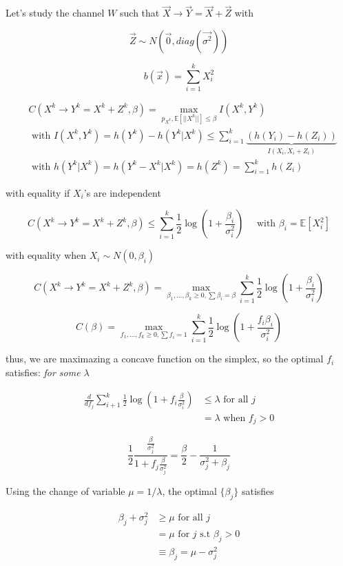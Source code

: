 \documentclass[twoside]{article}
\theoremstyle{definition} %
\newcommand{\Ex}[1]{\mathbb{E}\left[#1\right]}
\begin{document}
Let's study the channel $W$ such that $\vec{X} \to \vec Y = \vec X + \vec Z$ with

\[
  \vec{Z} \sim N(\vec{0}, diag(\vec{\sigma^2}))
\]

\[
  b(\vec{x}) = \sum_{i = 1}^k X_i^2
\]

\begin{align*}
  &C(X^k \rightarrow Y^k = X^k + Z^k, \beta) = \max_{p_{X^k}, \Ex{||X^k||} \leq \beta} I(X^k, Y^k) \\
  & \text{ with } I(X^k, Y^k) = h(Y^k) - h(Y^k | X^k) \leq \sum_{i = 1}^k \underbrace{(h(Y_i) - h(Z_i))}_{I(X_i, X_i + Z_i)} \\
  & \text{ with } h(Y^k | X^k) = h(Y^k - X^k | X^k) = h(Z^k) = \sum_{i = 1}^k h(Z_i)
\end{align*}

with equality if $X_i$'s are independent

\[
  C(X^k \rightarrow Y^k = X^k + Z^k, \beta) \leq \sum_{i = 1}^k \frac{1}{2} \log \left(1 + \frac{\beta_i}{\sigma^2_i}\right) \quad \text{ with } \beta_i = \Ex{X_i^2}
\]

with equality when $X_i \sim N(0, \beta_i)$

\[
  C(X^k \rightarrow Y^k = X^k + Z^k, \beta) = \max_{\beta_1, ..., \beta_k \geq 0, \sum \beta_i = \beta} \sum_{i = 1}^k \frac{1}{2} \log \left(1 + \frac{\beta_i}{\sigma^2_i} \right)
\]

\[
  C(\beta) = \max_{f_1, ..., f_k \geq 0, \sum f_i = 1} \sum_{i = 1}^k \frac{1}{2} \log \left(1 + \frac{f_i \beta_i}{\sigma^2_i} \right)
\]

thus, we are maximazing a concave function on the simplex, so the optimal $f_i$ satisfies: \textit{for some $\lambda$}

\begin{align*}
  \frac{d}{d f_j} \sum_{i + 1}^k \frac{1}{2} \log(1 + f_i \frac{\beta}{\sigma_i^2}) &\leq \lambda \text{ for all $j$}\\
              &= \lambda \text{ when } f_j > 0
\end{align*}

\[
  \frac{1}{2} \frac{\frac{\beta}{\sigma^2_j}}{1 + f_j \frac{\beta}{\sigma^2_j}} = \frac{\beta}{2} - \frac{1}{\sigma_j^2 + \beta_j}
\]

Using the change of variable $\mu = 1 / \lambda$, the optimal $\{\beta_j\}$ satisfies

\begin{align*}
  \beta_j + \sigma_j^2 &\geq \mu \text{ for all } j \\
                       &= \mu  \text{ for } j \text{ s.t } \beta_j > 0 \\
                       & \equiv \beta_j = \mu - \sigma_j^2
\end{align*}
\end{document}
